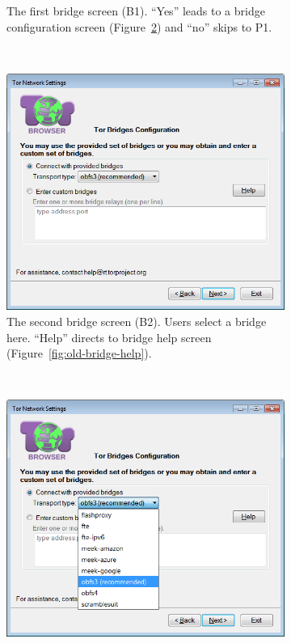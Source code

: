 \documentclass[USenglish,oneside,twocolumn]{article}
\begin{document}
\begin{figure}
\begin{subfigure}[b]{0.30\textwidth}
	\centering\captionsetup{width=1.5\linewidth}%
	\caption{The first bridge screen (B1). ``Yes'' leads to a bridge configuration screen (Figure~\ref{fig:old-bridge-settings}) and ``no'' skips to P1.}
	\label{fig:old-bridge}
\end{subfigure}
~~~~~~~~~~
\begin{subfigure}[b]{0.30\textwidth}
	\includegraphics[width=\textwidth]{screenshots/OLD-bridgeSettings.png}
	\centering\captionsetup{width=1.5\linewidth}%
	\caption{The second bridge screen (B2). Users select a bridge here. ``Help'' directs to bridge help screen (Figure~\ref{fig:old-bridge-help}). }
	\label{fig:old-bridge-settings}
\end{subfigure}
~~~~~~~~~~~~~~~~~~~~~~~~~
\begin{subfigure}[b]{0.30\textwidth}
	\includegraphics[width=\textwidth]{screenshots/OLD-bridgeSettings-combobox.png}

\end{subfigure}
\end{figure}
\end{document}
